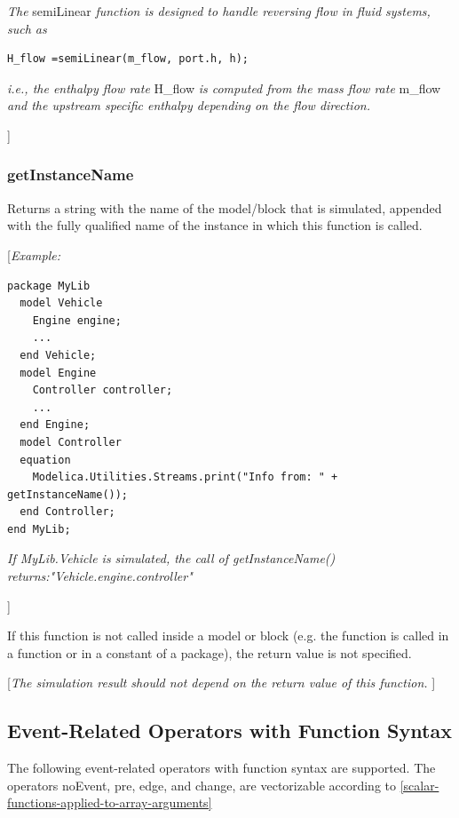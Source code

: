 \documentclass[10pt,a4paper]{report}
\def\doublelabel#1{\label{#1}}
\begin{document}
\emph{The} semiLinear \emph{function is designed to handle reversing
flow in fluid systems, such as}
\begin{lstlisting}[language=modelica]
H_flow =semiLinear(m_flow, port.h, h);
\end{lstlisting}

\emph{i.e., the enthalpy flow rate} H\_flow \emph{is computed from the
mass flow rate} m\_flow \emph{and the upstream specific enthalpy
depending on the flow direction. }

{]}

\subsubsection{getInstanceName}\doublelabel{getinstancename}

Returns a string with the name of the model/block that is simulated,
appended with the fully qualified name of the instance in which this
function is called.

{[}\emph{Example:}
\begin{lstlisting}[language=modelica]
package MyLib
  model Vehicle
    Engine engine;
    ...
  end Vehicle;
  model Engine
    Controller controller;
    ...
  end Engine;
  model Controller
  equation
    Modelica.Utilities.Streams.print("Info from: " + getInstanceName());
  end Controller;
end MyLib;
\end{lstlisting}

\emph{If MyLib.Vehicle is simulated, the call of getInstanceName()
returns:"Vehicle.engine.controller"}

{]}

If this function is not called inside a model or block (e.g. the
function is called in a function or in a constant of a package), the
return value is not specified.

{[}\emph{The simulation result should not depend on the return value of
this function.} {]}

\subsection{Event-Related Operators with Function Syntax}\doublelabel{event-related-operators-with-function-syntax}

The following event-related operators with function syntax are
supported. The operators noEvent, pre, edge, and change, are
vectorizable according to \ref{scalar-functions-applied-to-array-arguments}
\end{document}
